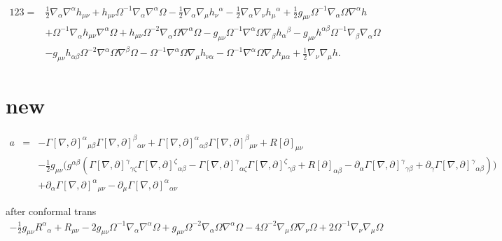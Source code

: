 \documentclass[10pt,letterpaper]{article}
\numberwithin{equation}{section}
\begin{document}
\begin{align}
123={}&\tfrac{1}{2} \nabla_{\alpha }\nabla^{\alpha }h_{\mu \nu }
+ h_{\mu \nu } \Omega^{-1} \nabla_{\alpha }\nabla^{\alpha }\Omega
-  \tfrac{1}{2} \nabla_{\alpha }\nabla_{\mu }h_{\nu }{}^{\alpha }
-  \tfrac{1}{2} \nabla_{\alpha }\nabla_{\nu }h_{\mu }{}^{\alpha }
+ \tfrac{1}{2} g_{\mu \nu } \Omega^{-1} \nabla_{\alpha }\Omega \nabla^{\alpha }h\nonumber\\
& + \Omega^{-1} \nabla_{\alpha }h_{\mu \nu } \nabla^{\alpha }\Omega
+ h_{\mu \nu } \Omega^{-2} \nabla_{\alpha }\Omega \nabla^{\alpha }\Omega
-  g_{\mu \nu } \Omega^{-1} \nabla^{\alpha }\Omega \nabla_{\beta }h_{\alpha }{}^{\beta }
-  g_{\mu \nu } h^{\alpha \beta } \Omega^{-1} \nabla_{\beta }\nabla_{\alpha }\Omega\nonumber\\
& -  g_{\mu \nu } h_{\alpha \beta } \Omega^{-2} \nabla^{\alpha }\Omega \nabla^{\beta }\Omega
-  \Omega^{-1} \nabla^{\alpha }\Omega \nabla_{\mu }h_{\nu \alpha }
-  \Omega^{-1} \nabla^{\alpha }\Omega \nabla_{\nu }h_{\mu \alpha }
+ \tfrac{1}{2} \nabla_{\nu }\nabla_{\mu }h.
\end{align}

\section{new}

\begin{eqnarray}
a&=& - \Gamma [\nabla ,\partial ]^{\alpha }{}_{\mu \beta } \Gamma [\nabla ,\partial ]^{\beta }{}_{\alpha \nu } + \Gamma [\nabla ,\partial ]^{\alpha }{}_{\alpha \beta } \Gamma [\nabla ,\partial ]^{\beta }{}_{\mu \nu } + R[\partial ]_{\mu \nu } \nonumber \\ 
&& -  \tfrac{1}{2} g_{\mu \nu } \bigl(g^{\alpha \beta } (\Gamma [\nabla ,\partial ]^{\gamma }{}_{\gamma \zeta } \Gamma [\nabla ,\partial ]^{\zeta }{}_{\alpha \beta } -  \Gamma [\nabla ,\partial ]^{\gamma }{}_{\alpha \zeta } \Gamma [\nabla ,\partial ]^{\zeta }{}_{\gamma \beta } + R[\partial ]_{\alpha \beta } -  \partial_{\alpha }\Gamma [\nabla ,\partial ]^{\gamma }{}_{\gamma \beta } + \partial_{\gamma }\Gamma [\nabla ,\partial ]^{\gamma }{}_{\alpha \beta })\bigr) \nonumber \\ 
&& + \partial_{\alpha }\Gamma [\nabla ,\partial ]^{\alpha }{}_{\mu \nu } -  \partial_{\mu }\Gamma [\nabla ,\partial ]^{\alpha }{}_{\alpha \nu }
\end{eqnarray}

after conformal trans
\begin{eqnarray}
- \tfrac{1}{2} g_{\mu \nu } R^{\alpha }{}_{\alpha } + R_{\mu \nu } - 2 g_{\mu \nu } \Omega^{-1} \nabla_{\alpha }\nabla^{\alpha }\Omega + g_{\mu \nu } \Omega^{-2} \nabla_{\alpha }\Omega \nabla^{\alpha }\Omega - 4 \Omega^{-2} \nabla_{\mu }\Omega \nabla_{\nu }\Omega + 2 \Omega^{-1} \nabla_{\nu }\nabla_{\mu }\Omega 
\end{eqnarray}
\end{document}
